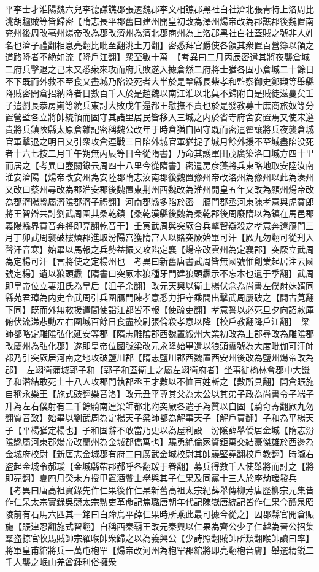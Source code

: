 平李士才淮陽魏六兒李德謙譙郡張遷魏郡李文相譙郡黑社白社濟北張青特上洛周比洮胡驢賊等皆歸密【隋志長平郡舊曰建州開皇初改為澤州煬帝改為郡譙郡後魏置南兖州後周改亳州煬帝改為郡改濟州為濟北郡商州為上洛郡黑社白社蓋賊之號非人姓名也濟子禮翻相息亮翻比毗至翻洮土刀翻】密悉拜官爵使各領其衆置百營簿以領之道路降者不絶如流【降戶江翻】衆至數十萬　【考異曰二月丙辰密遣其將夜襲倉城二府兵擊退之己未又悉衆來攻而府兵敗遂入據倉然二府將士猶各固小倉城二十餘日不下既而外救不至食又盡城乃陷没死者大半於是鞏縣長柴孝和監察御史鄭頲等舉縣降賊密開倉招納降者日數百千人於是趙魏以南江淮以北莫不歸附自是賊徒滋蔓矣壬子遣劉長恭房崱等繞兵東討大敗戊午還都王慰撫不責也於是發教募士庶商旅奴等分置營壁各立將帥統領而固守其諸里居民皆移入三城之内於省寺府舍安置焉又使宋遵貴將兵鎮陜縣太原倉雜記密稱魏公改年于時倉猶自固守既而密遣翟讓將兵夜襲倉城官軍擊退之明日又引衆攻倉連戰三日陷外城官軍猶捉子城月餘外援不至城盡陷没死者十六七按二月壬午朔無丙辰等日今從隋書】乃命其護軍田茂廣築洛口城方四十里而居之【考異曰壺關錄云周四十八里今從隋書】密遣房彦藻將兵東略地取安陸汝南淮安濟陽【煬帝改安州為安陸郡隋志汝南郡後魏置豫州帝改洛州為豫州以此為溱州又改曰蔡州尋改為郡淮安郡後魏置東荆州西魏改為淮州開皇五年又改為顯州煬帝改為郡濟陽縣屬濟隂郡濟子禮翻】河南郡縣多陷於密　鴈門郡丞河東陳孝意與虎賁郎將王智辯共討劉武周圍其桑乾鎮【桑乾漢縣後魏為桑乾郡後周廢隋以為鎮在馬邑郡義陽縣界賁音奔將即亮翻乾音干】壬寅武周與突厥合兵擊智辯殺之孝意奔還鴈門三月丁卯武周襲破樓煩郡進取汾陽宫獲隋宫人以賂突厥始畢可汗【厥九勿翻可從刋入聲汗音寒】始畢以馬報之兵勢益振又攻陷定襄【煬帝改雲州為定襄郡】突厥立武周為定楊可汗【言將使之定楊州也　考異曰新舊唐書武周皆無國號惟創業起居注云國號定楊】遺以狼頭纛【隋書曰突厥本狼種牙門建狼頭纛示不忘本也遺于季翻】武周即皇帝位立妻沮氏為皇后【沮子余翻】改元天興以衛士楊伏念為尚書左僕射妹婿同縣苑君璋為内史令武周引兵圍鴈門陳孝意悉力拒守乘間出擊武周屢破之【間古莧翻下同】既而外無救援遣間使詣江都皆不報【使疏吏翻】孝意誓以必死旦夕向詔敕庫俯伏流涕悲動左右圍城百餘日食盡校尉張倫殺孝意以降【校戶教翻降戶江翻】　梁師都略定雕隂弘化延安等郡【隋志雕隂郡西魏置綏州大業初改為上郡尋改為雕隂郡改慶州為弘化郡】遂即皇帝位國號梁改元永隆始畢遺以狼頭纛號為大度毗伽可汗師都乃引突厥居河南之地攻破鹽川郡【隋志鹽川郡西魏置西安州後改為鹽州煬帝改為郡】　左翊衛蒲城郭子和【郭子和蓋衛士之屬左翊衛府者】坐事徙榆林會郡中大饑子和濳結敢死士十八人攻郡門執郡丞王才數以不恤百姓斬之【數所具翻】開倉賑施自稱永樂王【施式豉翻樂音洛】改元丑平尊其父為太公以其弟子政為尚書令子端子升為左右僕射有二千餘騎南連梁師都北附突厥各遣子為質以自固【騎奇寄翻厥九勿翻質音致】始畢以劉武周為定楊天子梁師都為解事天子【解戶買翻】子和為平楊天子【平楊猶定楊也】子和固辭不敢當乃更以為屋利設　汾隂薛舉僑居金城【隋志汾隂縣屬河東郡煬帝改蘭州為金城郡僑寓也】驍勇絶倫家資鉅萬交結豪傑雄於西邊為金城府校尉【新唐志金城郡有府二曰廣武金城校尉其帥驍堅堯翻校戶教翻】時隴右盗起金城令郝瑗【金城縣帶郡郝呼各翻瑗于眷翻】募兵得數千人使舉將而討之【將即亮翻】夏四月癸未方授甲置酒饗士舉與其子仁果及同黨十三人於座劫瑗發兵　【考異曰唐高祖實錄先作仁果後作仁杲新舊高祖太宗紀薛舉傳柳芳唐歷柳宗元集皆作仁杲太宗實錄吳競太宗勲吏革命記焦璐唐朝年代記陳嶽唐統記皆作仁果今醴泉昭陵前有石馬六匹其一銘曰白蹄烏平薛仁果時所乘此最可據今從之】囚郡縣官開倉賑施【賑津忍翻施式智翻】自稱西秦覇王改元秦興以仁果為齊公少子仁越為晉公招集羣盗掠官牧馬賊帥宗羅㬋帥衆歸之以為義興公【少詩照翻賊帥所類翻睺帥讀曰率】將軍皇甫綰將兵一萬屯枹罕【煬帝改河州為枹罕郡綰將即亮翻枹音膚】舉選精鋭二千人襲之岷山羌酋鍾利俗擁衆